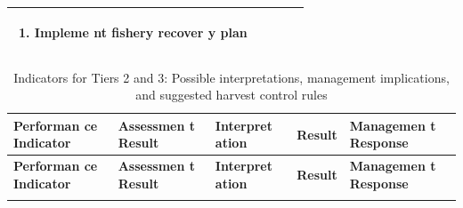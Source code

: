 \documentclass[]{book}
\providecommand{\tightlist}{%
  \setlength{\itemsep}{0pt}\setlength{\parskip}{0pt}}
\begin{document}
\begin{longtable}[]{@{}lllll@{}}
\begin{minipage}[t]{0.19\columnwidth}
\begin{enumerate}
\def\labelenumi{\arabic{enumi}.}
\tightlist
\item
  Impleme nt fishery recover y plan
\end{enumerate}\strut
\end{minipage}\tabularnewline
\bottomrule
\end{longtable}

\begin{longtable}[]{@{}lllll@{}}
\caption{\label{tab:hcrs-2} Indicators for Tiers 2 and 3: Possible
interpretations, management implications, and suggested harvest control
rules}\tabularnewline
\toprule
\begin{minipage}[b]{0.17\columnwidth}\raggedright\strut
\textbf{Performan ce Indicator}\strut
\end{minipage} & \begin{minipage}[b]{0.17\columnwidth}\raggedright\strut
\textbf{Assessmen t Result}\strut
\end{minipage} & \begin{minipage}[b]{0.17\columnwidth}\raggedright\strut
\textbf{Interpret ation}\strut
\end{minipage} & \begin{minipage}[b]{0.17\columnwidth}\raggedright\strut
\textbf{Result}\strut
\end{minipage} & \begin{minipage}[b]{0.17\columnwidth}\raggedright\strut
\textbf{Managemen t Response}\strut
\end{minipage}\tabularnewline
\midrule
\endfirsthead
\toprule
\begin{minipage}[b]{0.17\columnwidth}\raggedright\strut
\textbf{Performan ce Indicator}\strut
\end{minipage} & \begin{minipage}[b]{0.17\columnwidth}\raggedright\strut
\textbf{Assessmen t Result}\strut
\end{minipage} & \begin{minipage}[b]{0.17\columnwidth}\raggedright\strut
\textbf{Interpret ation}\strut
\end{minipage} & \begin{minipage}[b]{0.17\columnwidth}\raggedright\strut
\textbf{Result}\strut
\end{minipage} & \begin{minipage}[b]{0.17\columnwidth}\raggedright\strut
\textbf{Managemen t Response}\strut
\end{minipage}\tabularnewline
\midrule
\endhead
\begin{minipage}[t]{0.19\columnwidth}\raggedright\strut

\end{minipage}
\end{longtable}
\end{document}
